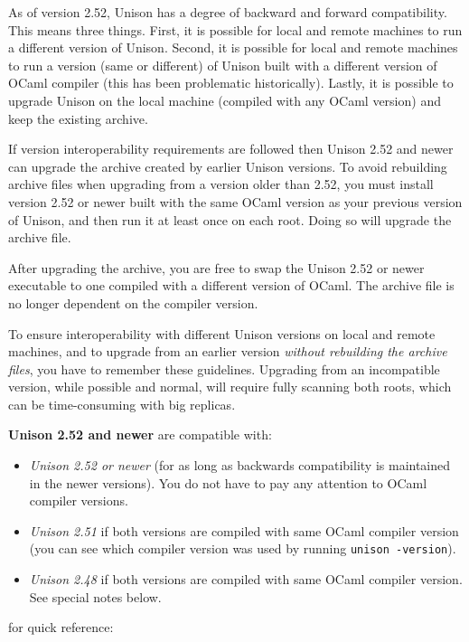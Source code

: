 \documentclass{article}
\begin{document}
As of version 2.52, Unison has a degree of backward and forward
compatibility.  This means three things.  First, it is possible for local
and remote machines to run a different version of Unison.  Second, it is
possible for local and remote machines to run a version (same or different)
of Unison built with a different version of OCaml compiler (this has been
problematic historically).  Lastly, it is possible to upgrade Unison on
the local machine (compiled with any OCaml version) and keep the existing
archive.

If version interoperability requirements are followed then Unison 2.52 and
newer can upgrade the archive created by earlier Unison versions.  To avoid
rebuilding archive files when upgrading from a version older than 2.52, you
must install version 2.52 or newer built with the same OCaml version as your
previous version of Unison, and then run it at least once on each root.  Doing
so will upgrade the archive file.

After upgrading the archive, you are free to swap the Unison 2.52 or newer
executable to one compiled with a different version of OCaml.
The archive file is no longer dependent on the compiler version.


To ensure interoperability with different Unison versions on local and
remote machines, and to upgrade from an earlier version {\em without
rebuilding the archive files}, you have to remember these guidelines.
Upgrading from an incompatible version, while possible and normal, will
require fully scanning both roots, which can be time-consuming with big
replicas.

{\bf Unison 2.52 and newer} are compatible with:
\begin{itemize}
\item {\em Unison 2.52 or newer} (for as long as backwards compatibility
is maintained in the newer versions). You do not have to pay any attention
to OCaml compiler versions.
\item {\em Unison 2.51} if both versions are compiled with same OCaml
compiler version (you can see which compiler version was used by running
{\tt unison -version}).
\item {\em Unison 2.48} if both versions are compiled with same OCaml
compiler version.  See special notes below.
\end{itemize}

\vspace{1em}
 for quick reference:
\end{document}
